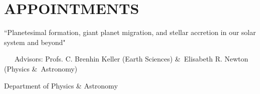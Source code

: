\section*{APPOINTMENTS}




``Planetesimal formation, giant planet migration, and stellar accretion in our solar system and beyond"

~~~Advisors: Profs. C. Brenhin Keller (Earth Sciences) \&\ Elisabeth R. Newton (Physics \&\ Astronomy)


Department of Physics \& Astronomy
